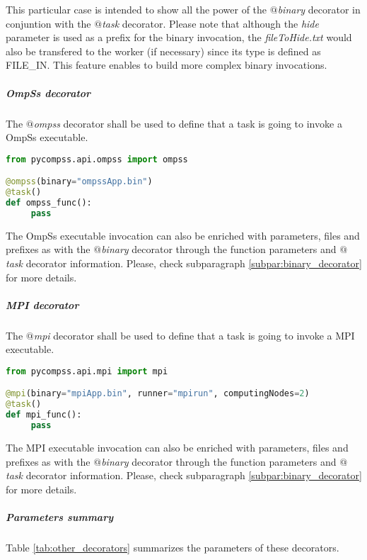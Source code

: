 This particular case is intended to show all the power of the {\it $@$binary} decorator in conjuntion with the
{\it $@$task} decorator. Please note that although the {\it hide} parameter is used as a prefix for the binary invocation,
the {\it fileToHide.txt} would also be transfered to the worker (if necessary) since its type is defined as FILE\_IN. 
This feature enables to build more complex binary invocations.

\subparagraph{OmpSs decorator}
\label{subpar:ompss_decorator}

The {\it $@$ompss} decorator shall be used to define that a task is going to invoke a OmpSs executable.

\begin{lstlisting}[language=python]
from pycompss.api.ompss import ompss

@ompss(binary="ompssApp.bin")
@task()
def ompss_func():
     pass
\end{lstlisting}

The OmpSs executable invocation can also be enriched with parameters, files and prefixes as with the 
{\it $@$binary} decorator through the function parameters and {\it $@$task} decorator information.
Please, check subparagraph \ref{subpar:binary_decorator} for more details.

\subparagraph{MPI decorator}
\label{subpar:mpi_decorator}

The {\it $@$mpi} decorator shall be used to define that a task is going to invoke a MPI executable.

\begin{lstlisting}[language=python]
from pycompss.api.mpi import mpi

@mpi(binary="mpiApp.bin", runner="mpirun", computingNodes=2)
@task()
def mpi_func():
     pass
\end{lstlisting}

The MPI executable invocation can also be enriched with parameters, files and prefixes as with the 
{\it $@$binary} decorator through the function parameters and {\it $@$task} decorator information.
Please, check subparagraph \ref{subpar:binary_decorator} for more details.

\subparagraph{Parameters summary}

Table \ref{tab:other_decorators} summarizes the parameters of these decorators.

